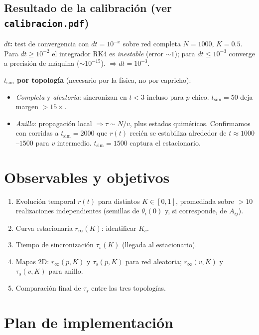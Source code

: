\documentclass[11pt,a4paper]{article}
\begin{document}
\subsection*{Resultado de la calibración (ver \texttt{calibracion.pdf})}

\textbf{$dt$:} test de convergencia con $dt = 10^{-x}$ sobre red completa $N=1000$, $K=0.5$. Para $dt \geq 10^{-2}$ el integrador RK4 es \emph{inestable} (error $\sim 1$); para $dt \leq 10^{-3}$ converge a precisión de máquina ($\sim 10^{-15}$). $\Rightarrow dt = 10^{-3}$.

\textbf{$t_{\text{sim}}$ por topología} (necesario por la física, no por capricho):
\begin{itemize}
\item \emph{Completa} y \emph{aleatoria}: sincronizan en $t<3$ incluso para $p$ chico. $t_{\text{sim}} = 50$ deja margen $>15\times$.
\item \emph{Anillo}: propagación local $\Rightarrow \tau \sim N/v$, plus estados quiméricos. Confirmamos con corridas a $t_{\text{sim}}=2000$ que $r(t)$ recién se estabiliza alrededor de $t\approx 1000$--$1500$ para $v$ intermedio. $t_{\text{sim}} = 1500$ captura el estacionario.
\end{itemize}

\section{Observables y objetivos}

\begin{enumerate}
  \item Evolución temporal $r(t)$ para distintos $K\in[0,1]$, promediada sobre $>10$ realizaciones independientes (semillas de $\theta_i(0)$ y, si corresponde, de $A_{ij}$).
  \item Curva estacionaria $r_\infty(K)$: identificar $K_c$.
  \item Tiempo de sincronización $\tau_s(K)$ (llegada al estacionario).
  \item Mapas 2D: $r_\infty(p,K)$ y $\tau_s(p,K)$ para red aleatoria; $r_\infty(v,K)$ y $\tau_s(v,K)$ para anillo.
  \item Comparación final de $\tau_s$ entre las tres topologías.
\end{enumerate}

\section{Plan de implementación}
\end{document}
